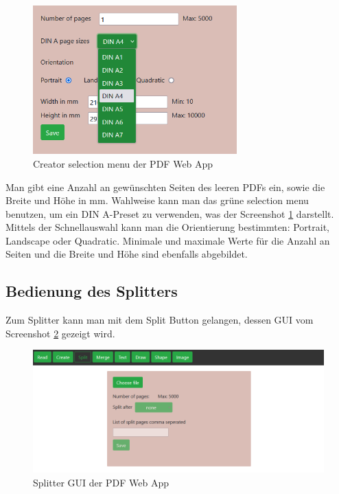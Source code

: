 \begin{figure}[!htbp]
	\centering
	\includegraphics[width=0.7\textwidth]{"images/creator-sel.png"}
	\caption{Creator selection menu der PDF Web App}
	\label{fig:creator-sel}
\end{figure}

Man gibt eine Anzahl an gewünschten Seiten des leeren PDFs ein, sowie die Breite und Höhe in mm. Wahlweise kann man das grüne selection menu benutzen, um ein DIN A-Preset zu verwenden, was der Screenshot \ref{fig:creator-sel} darstellt. Mittels der Schnellauswahl kann man die Orientierung bestimmten: Portrait, Landscape oder Quadratic. Minimale und maximale Werte für die Anzahl an Seiten und die Breite und Höhe sind ebenfalls abgebildet. 

\subsection{Bedienung des Splitters}
Zum Splitter kann man mit dem Split Button gelangen, dessen GUI vom Screenshot \ref{fig:splitter} gezeigt wird.

\begin{figure}[!htbp]
	\centering
	\includegraphics[width=1\textwidth]{"images/splitter.png"}
	\caption{Splitter GUI der PDF Web App}
	\label{fig:splitter}
\end{figure}

